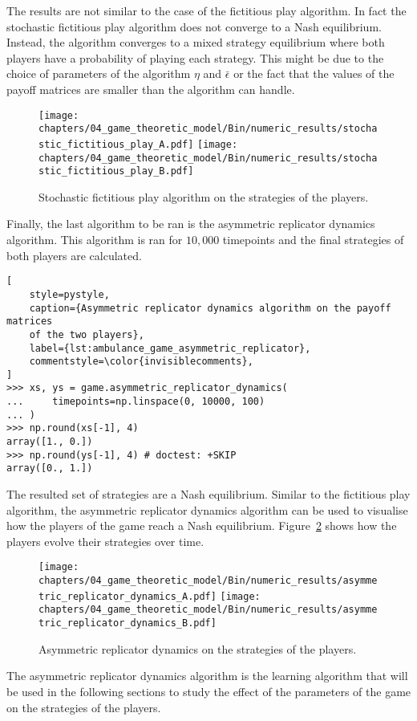 The results are not similar to the case of the fictitious play algorithm.
In fact the stochastic fictitious play algorithm does not converge to a Nash
equilibrium.
Instead, the algorithm converges to a mixed strategy equilibrium where both
players have a probability of playing each strategy.
This might be due to the choice of parameters of the algorithm \(\eta\) and
\(\bar{\epsilon}\) or the fact that the values of the payoff matrices are
smaller than the algorithm can handle.

\begin{figure}[H]
    \centering
    \texttt{[image: chapters/04\_game\_theoretic\_model/Bin/numeric\_results/stochastic\_fictitious\_play\_A.pdf]}
    \texttt{[image: chapters/04\_game\_theoretic\_model/Bin/numeric\_results/stochastic\_fictitious\_play\_B.pdf]}
    \caption{Stochastic fictitious play algorithm on the strategies of the
    players.}
    \label{fig:solving_game_stochastic_fictitious_example}
\end{figure}

Finally, the last algorithm to be ran is the asymmetric replicator dynamics
algorithm.
This algorithm is ran for \(10,\!000\) timepoints and the final strategies of
both players are calculated.

\begin{lstlisting}[
    style=pystyle,
    caption={Asymmetric replicator dynamics algorithm on the payoff matrices
    of the two players},
    label={lst:ambulance_game_asymmetric_replicator},
    commentstyle=\color{invisiblecomments},
]
>>> xs, ys = game.asymmetric_replicator_dynamics(
...     timepoints=np.linspace(0, 10000, 100)    
... )
>>> np.round(xs[-1], 4)
array([1., 0.])
>>> np.round(ys[-1], 4) # doctest: +SKIP
array([0., 1.])

\end{lstlisting}

The resulted set of strategies are a Nash equilibrium.
Similar to the fictitious play algorithm, the asymmetric replicator dynamics
algorithm can be used to visualise how the players of the game reach a Nash
equilibrium.
Figure~\ref{fig:solving_game_asymmetric_replicator_example} shows how the
players evolve their strategies over time.

\begin{figure}[H]
    \centering
    \texttt{[image: chapters/04\_game\_theoretic\_model/Bin/numeric\_results/asymmetric\_replicator\_dynamics\_A.pdf]}
    \texttt{[image: chapters/04\_game\_theoretic\_model/Bin/numeric\_results/asymmetric\_replicator\_dynamics\_B.pdf]}
    \caption{Asymmetric replicator dynamics on the strategies of the players.}
    \label{fig:solving_game_asymmetric_replicator_example}
\end{figure}

The asymmetric replicator dynamics algorithm is the learning algorithm that
will be used in the following sections to study the effect of the parameters
of the game on the strategies of the players.
